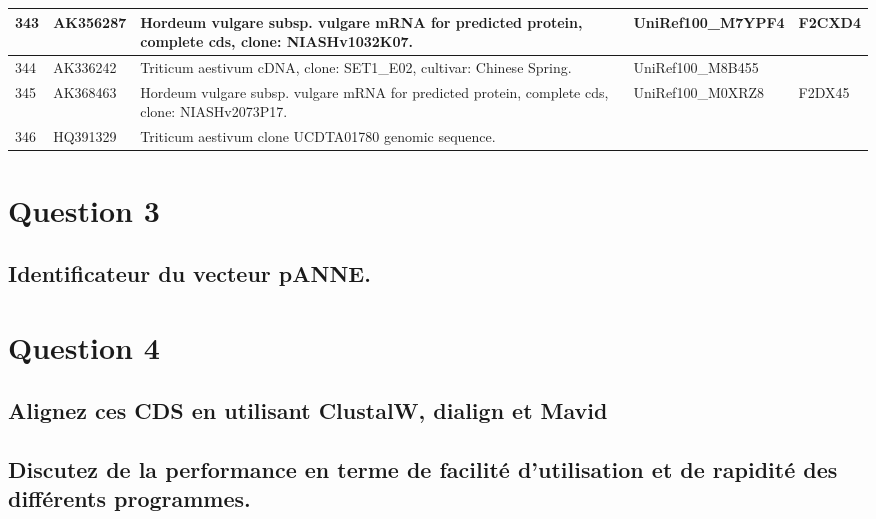 \documentclass[10.9pt]{article} %
\begin{document}
{\begin{longtable}{|p{1.3cm}|p{1.8cm}|p{6.2cm}|p{3.8cm}|p{2cm}|}
\hline
343 & AK356287 & Hordeum vulgare subsp. vulgare mRNA for predicted protein, complete cds, clone: NIASHv1032K07. & UniRef100\_M7YPF4 & F2CXD4\\
\hline
344 & AK336242 & Triticum aestivum cDNA, clone: SET1\_E02, cultivar: Chinese Spring. & UniRef100\_M8B455 & \\
\hline
345 & AK368463 & Hordeum vulgare subsp. vulgare mRNA for predicted protein, complete cds, clone: NIASHv2073P17. & UniRef100\_M0XRZ8 & F2DX45\\
\hline
346 & HQ391329 & Triticum aestivum clone UCDTA01780 genomic sequence. &  & \\
\hline
\end{longtable}
}





 
\section{Question 3} %

\subsection[Identification du vecteur pANNE]{Identificateur du vecteur pANNE.}


\section{Question 4} %

\subsection[Alignement multiple]{Alignez ces CDS en utilisant ClustalW, dialign et Mavid}


\subsection[Facilité et rapidité des programmes]{Discutez de la performance en terme de facilité
d'utilisation et de rapidité des différents programmes.}
\end{document}
